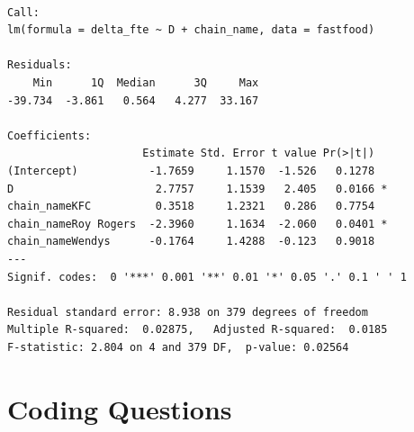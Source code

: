 \documentclass[
  letterpaper,
  DIV=11,
  numbers=noendperiod]{scrreprt}
\newenvironment{Shaded}{\begin{snugshade}}{\end{snugshade}}
\newcommand{\AttributeTok}[1]{\textcolor[rgb]{0.40,0.45,0.13}{#1}}
\newcommand{\CommentTok}[1]{\textcolor[rgb]{0.37,0.37,0.37}{#1}}
\newcommand{\FunctionTok}[1]{\textcolor[rgb]{0.28,0.35,0.67}{#1}}
\newcommand{\NormalTok}[1]{\textcolor[rgb]{0.00,0.23,0.31}{#1}}
\newcommand{\OtherTok}[1]{\textcolor[rgb]{0.00,0.23,0.31}{#1}}
\newcommand{\SpecialCharTok}[1]{\textcolor[rgb]{0.37,0.37,0.37}{#1}}
\begin{document}
\begin{Shaded}
\end{Shaded}

\begin{verbatim}

Call:
lm(formula = delta_fte ~ D + chain_name, data = fastfood)

Residuals:
    Min      1Q  Median      3Q     Max 
-39.734  -3.861   0.564   4.277  33.167 

Coefficients:
                     Estimate Std. Error t value Pr(>|t|)  
(Intercept)           -1.7659     1.1570  -1.526   0.1278  
D                      2.7757     1.1539   2.405   0.0166 *
chain_nameKFC          0.3518     1.2321   0.286   0.7754  
chain_nameRoy Rogers  -2.3960     1.1634  -2.060   0.0401 *
chain_nameWendys      -0.1764     1.4288  -0.123   0.9018  
---
Signif. codes:  0 '***' 0.001 '**' 0.01 '*' 0.05 '.' 0.1 ' ' 1

Residual standard error: 8.938 on 379 degrees of freedom
Multiple R-squared:  0.02875,   Adjusted R-squared:  0.0185 
F-statistic: 2.804 on 4 and 379 DF,  p-value: 0.02564
\end{verbatim}

\section{Coding Questions}\label{coding-questions-4}
\end{document}
